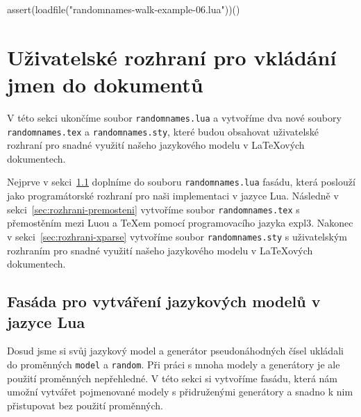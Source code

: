 \documentclass{csbulletin}
\newcommand\vref[1]{\ref{#1} na straně~\pageref{#1}}
\let\vref=\ref
\begin{document}
\noindent
\begin{luacode*}
assert(loadfile("randomnames-walk-example-06.lua"))()
\end{luacode*}

\section{Uživatelské rozhraní pro vkládání jmen do dokumentů}
\label{sec:rozhrani}

V této sekci ukončíme soubor \texttt{randomnames.lua} a vytvoříme dva nové soubory \texttt{randomnames.tex} a \texttt{randomnames.sty}, které budou obsahovat uživatelské rozhraní pro snadné využití našeho jazykového modelu v \LaTeX ových dokumentech.

Nejprve v sekci~\ref{sec:rozhrani-fasada} doplníme do souboru \texttt{randomnames.lua} fasádu, která poslouží jako programátorské rozhraní pro naši implementaci v jazyce Lua. Následně v sekci~\vref{sec:rozhrani-premosteni} vytvoříme soubor \texttt{randomnames.tex} s přemostěním mezi Luou a \TeX em pomocí programovacího jazyka expl3. Nakonec v sekci~\vref{sec:rozhrani-xparse} vytvoříme soubor \texttt{randomnames.sty} s uživatelským rozhraním pro snadné využití našeho jazykového modelu v \LaTeX ových dokumentech.

\subsection{Fasáda pro vytváření jazykových modelů v jazyce Lua}
\label{sec:rozhrani-fasada}

Dosud jsme si svůj jazykový model a generátor pseudonáhodných čísel ukládali do proměnných \texttt{model} a \texttt{random}. Při práci s mnoha modely a generátory je ale použití proměnných nepřehledné. V této sekci si vytvoříme fasádu, která nám umožní vytvářet pojmenované modely s přidruženými generátory a snadno k nim přistupovat bez použití proměnných.
\end{document}
